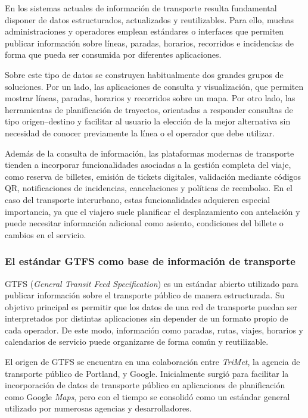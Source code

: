 En los sistemas actuales de información de transporte resulta fundamental disponer de datos estructurados, actualizados y reutilizables. Para ello, muchas administraciones y operadores emplean estándares o interfaces que permiten publicar información sobre líneas, paradas, horarios, recorridos e incidencias de forma que pueda ser consumida por diferentes aplicaciones.

Sobre este tipo de datos se construyen habitualmente dos grandes grupos de soluciones. Por un lado, las aplicaciones de consulta y visualización, que permiten mostrar líneas, paradas, horarios y recorridos sobre un mapa. Por otro lado, las herramientas de planificación de trayectos, orientadas a responder consultas de tipo origen--destino y facilitar al usuario la elección de la mejor alternativa sin necesidad de conocer previamente la línea o el operador que debe utilizar.

Además de la consulta de información, las plataformas modernas de transporte tienden a incorporar funcionalidades asociadas a la gestión completa del viaje, como reserva de billetes, emisión de tickets digitales, validación mediante códigos QR, notificaciones de incidencias, cancelaciones y políticas de reembolso. En el caso del transporte interurbano, estas funcionalidades adquieren especial importancia, ya que el viajero suele planificar el desplazamiento con antelación y puede necesitar información adicional como asiento, condiciones del billete o cambios en el servicio.

\subsubsection{El estándar GTFS como base de información de transporte}

GTFS (\textit{General Transit Feed Specification}) es un estándar abierto utilizado para publicar información sobre el transporte público de manera estructurada. Su objetivo principal es permitir que los datos de una red de transporte puedan ser interpretados por distintas aplicaciones sin depender de un formato propio de cada operador. De este modo, información como paradas, rutas, viajes, horarios y calendarios de servicio puede organizarse de forma común y reutilizable.

El origen de GTFS se encuentra en una colaboración entre \textit{TriMet}, la agencia de transporte público de Portland, y Google. Inicialmente surgió para facilitar la incorporación de datos de transporte público en aplicaciones de planificación como Google \textit{Maps}, pero con el tiempo se consolidó como un estándar general utilizado por numerosas agencias y desarrolladores.

